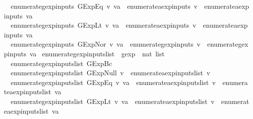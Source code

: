 \begin{isabellebody}
\ \ {\isachardoublequoteopen}enumerate{\isacharunderscore}gexp{\isacharunderscore}inputs\ {\isacharparenleft}GExp{\isachardot}Eq\ v\ va{\isacharparenright}\ {\isacharequal}\ enumerate{\isacharunderscore}aexp{\isacharunderscore}inputs\ v\ {\isasymunion}\ enumerate{\isacharunderscore}aexp{\isacharunderscore}inputs\ va{\isachardoublequoteclose}\ {\isacharbar}\isanewline
\ \ {\isachardoublequoteopen}enumerate{\isacharunderscore}gexp{\isacharunderscore}inputs\ {\isacharparenleft}GExp{\isachardot}Lt\ v\ va{\isacharparenright}\ {\isacharequal}\ enumerate{\isacharunderscore}aexp{\isacharunderscore}inputs\ v\ {\isasymunion}\ enumerate{\isacharunderscore}aexp{\isacharunderscore}inputs\ va{\isachardoublequoteclose}\ {\isacharbar}\isanewline
\ \ {\isachardoublequoteopen}enumerate{\isacharunderscore}gexp{\isacharunderscore}inputs\ {\isacharparenleft}GExp{\isachardot}Nor\ v\ va{\isacharparenright}\ {\isacharequal}\ enumerate{\isacharunderscore}gexp{\isacharunderscore}inputs\ v\ {\isasymunion}\ enumerate{\isacharunderscore}gexp{\isacharunderscore}inputs\ va{\isachardoublequoteclose}\isanewline
\isanewline
{}\isamarkupfalse%
\ enumerate{\isacharunderscore}gexp{\isacharunderscore}inputs{\isacharunderscore}list\ {\isacharcolon}{\isacharcolon}\ {\isachardoublequoteopen}gexp\ {\isasymRightarrow}\ nat\ list{\isachardoublequoteclose}\ \isanewline
\ \ {\isachardoublequoteopen}enumerate{\isacharunderscore}gexp{\isacharunderscore}inputs{\isacharunderscore}list\ {\isacharparenleft}GExp{\isachardot}Bc\ {\isacharunderscore}{\isacharparenright}\ {\isacharequal}\ {\isacharbrackleft}{\isacharbrackright}{\isachardoublequoteclose}\ {\isacharbar}\isanewline
\ \ {\isachardoublequoteopen}enumerate{\isacharunderscore}gexp{\isacharunderscore}inputs{\isacharunderscore}list\ {\isacharparenleft}GExp{\isachardot}Null\ v{\isacharparenright}\ {\isacharequal}\ enumerate{\isacharunderscore}aexp{\isacharunderscore}inputs{\isacharunderscore}list\ v{\isachardoublequoteclose}\ {\isacharbar}\isanewline
\ \ {\isachardoublequoteopen}enumerate{\isacharunderscore}gexp{\isacharunderscore}inputs{\isacharunderscore}list\ {\isacharparenleft}GExp{\isachardot}Eq\ v\ va{\isacharparenright}\ {\isacharequal}\ enumerate{\isacharunderscore}aexp{\isacharunderscore}inputs{\isacharunderscore}list\ v\ {\isacharat}\ enumerate{\isacharunderscore}aexp{\isacharunderscore}inputs{\isacharunderscore}list\ va{\isachardoublequoteclose}\ {\isacharbar}\isanewline
\ \ {\isachardoublequoteopen}enumerate{\isacharunderscore}gexp{\isacharunderscore}inputs{\isacharunderscore}list\ {\isacharparenleft}GExp{\isachardot}Lt\ v\ va{\isacharparenright}\ {\isacharequal}\ enumerate{\isacharunderscore}aexp{\isacharunderscore}inputs{\isacharunderscore}list\ v\ {\isacharat}\ enumerate{\isacharunderscore}aexp{\isacharunderscore}inputs{\isacharunderscore}list\ va{\isachardoublequoteclose}\ {\isacharbar}\isanewline

\end{isabellebody}
